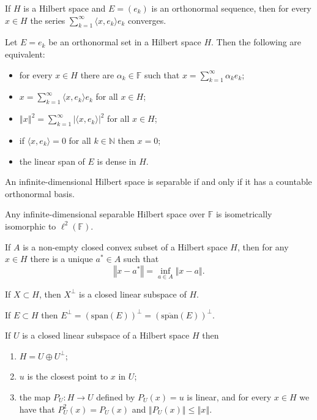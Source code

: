 \documentclass[a4paper]{article}
\newcommand{\N}{\mathbb{N}}
\newcommand{\F}{\mathbb{F}}
\newcommand{\norm}[1]{\left\Vert #1 \right\Vert}
\newcommand{\<}{\langle}
\renewcommand{\>}{\rangle}
\renewcommand{\a}{\alpha}
\renewcommand{\span}{\mathrm{span}}
\begin{document}
\begin{prop}
  If $H$ is a Hilbert space and $E = (e_k)$ is an orthonormal sequence, then for every $x\in H$ the series $\sum_{k=1}^\infty \<x,e_k\>e_k$ converges.
\end{prop}

\begin{prop}
  Let $E={e_k}$ be an orthonormal set in a Hilbert space $H$. Then the following are equivalent:
  \begin{itemize}
    \item for every $x\in H$ there are $\a_k\in\F$ such that $x = \sum_{k=1}^\infty \a_k e_k$;
    \item $x = \sum_{k=1}^\infty\<x,e_k\>e_k$ for all $x\in H$;
    \item $\norm{x}^2 = \sum_{k=1}^\infty|\<x,e_k\>|^2$ for all $x\in H$;
    \item if $\<x,e_k\>=0$ for all $k\in\N$ then $x=0$;
    \item the linear span of $E$ is dense in $H$.
  \end{itemize}
\end{prop}

\begin{thm}
  An infinite-dimensional Hilbert space is separable if and only if it has a countable orthonormal basis.
\end{thm}

\begin{thm}
  Any infinite-dimensional separable Hilbert space over $\F$ is isometrically isomorphic to $\ell^2(\F)$.
\end{thm}

\begin{lemma}
  If $A$ is a non-empty closed convex subset of a Hilbert space $H$, then for any $x\in H$ there is a unique $a^*\in A$ such that
  $$\norm{x-a^*}=\inf_{a\in A}\norm{x-a}.$$
\end{lemma}

\begin{prop}
  If $X\subset H$, then $X^\perp$ is a closed linear subspace of $H$.
\end{prop}

\begin{prop}
  If $E\subset H$ then $E^\perp = (\span(E))^\perp = (\overline{\span}(E))^\perp$.
\end{prop}

\begin{thm}
  If $U$ is a closed linear subspace of a Hilbert space $H$ then
  \begin{enumerate}
    \item $H = U\oplus U^\perp$;
    \item $u$ is the closest point to $x$ in $U$;
    \item the map $P_U:H\to U$ defined by $P_U(x)=u$ is linear, and for every $x\in H$ we have that $P_U^2(x)=P_U(x)$ and $\norm{P_U(x)}\leq\norm{x}$.
  \end{enumerate}
\end{thm}
\end{document}
